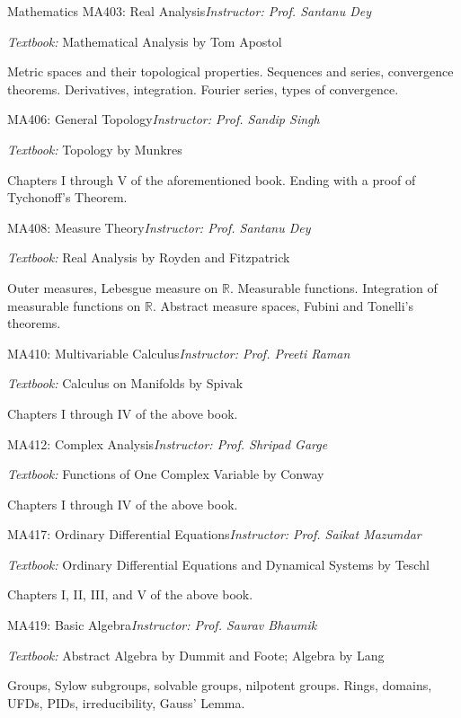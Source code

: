 \begin{rubric}{Mathematics}
    \entry*[AA] MA403: Real Analysis\hfill\emph{Instructor: Prof. Santanu Dey}

    \emph{Textbook:} Mathematical Analysis by Tom Apostol

    Metric spaces and their topological properties. Sequences and series, convergence theorems. Derivatives, integration. Fourier series, types of convergence.


    \entry*[AA] MA406: General Topology\hfill\emph{Instructor: Prof. Sandip Singh}

    \emph{Textbook:} Topology by Munkres

    Chapters I through V of the aforementioned book. Ending with a proof of Tychonoff's Theorem.

    \entry*[AA] MA408: Measure Theory\hfill\emph{Instructor: Prof. Santanu Dey}

    \emph{Textbook:} Real Analysis by Royden and Fitzpatrick

    Outer measures, Lebesgue measure on $\mathbb R$. Measurable functions. Integration of measurable functions on $\mathbb R$. Abstract measure spaces, Fubini and Tonelli's theorems.

    \entry*[AP] MA410: Multivariable Calculus\hfill\emph{Instructor: Prof. Preeti Raman}

    \emph{Textbook:} Calculus on Manifolds by Spivak

    Chapters I through IV of the above book. 

    \entry*[AP] MA412: Complex Analysis\hfill\emph{Instructor: Prof. Shripad Garge}

    \emph{Textbook:} Functions of One Complex Variable by Conway

    Chapters I through IV of the above book.

    \entry*[AP] MA417: Ordinary Differential Equations\hfill\emph{Instructor: Prof. Saikat Mazumdar}

    \emph{Textbook:} Ordinary Differential Equations and Dynamical Systems by Teschl 

    Chapters I, II, III, and V of the above book.

    \entry*[AA] MA419: Basic Algebra\hfill\emph{Instructor: Prof. Saurav Bhaumik}
    
    \emph{Textbook:} Abstract Algebra by Dummit and Foote; Algebra by Lang

    Groups, Sylow subgroups, solvable groups, nilpotent groups. Rings, domains, UFDs, PIDs, irreducibility, Gauss' Lemma.


\end{rubric}

